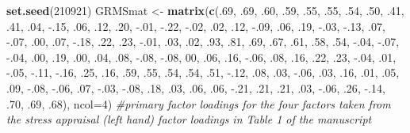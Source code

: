 \documentclass[
  english,
]{book}
\newenvironment{Shaded}{\begin{snugshade}}{\end{snugshade}}
\newcommand{\CommentTok}[1]{\textcolor[rgb]{0.56,0.35,0.01}{\textit{#1}}}
\newcommand{\DataTypeTok}[1]{\textcolor[rgb]{0.13,0.29,0.53}{#1}}
\newcommand{\DecValTok}[1]{\textcolor[rgb]{0.00,0.00,0.81}{#1}}
\newcommand{\FloatTok}[1]{\textcolor[rgb]{0.00,0.00,0.81}{#1}}
\newcommand{\KeywordTok}[1]{\textcolor[rgb]{0.13,0.29,0.53}{\textbf{#1}}}
\newcommand{\NormalTok}[1]{#1}
\newcommand{\StringTok}[1]{\textcolor[rgb]{0.31,0.60,0.02}{#1}}
\begin{document}
\begin{Shaded}
\begin{Highlighting}[]
\KeywordTok{set.seed}\NormalTok{(}\DecValTok{210921}\NormalTok{)}
\NormalTok{GRMSmat <-}\StringTok{ }\KeywordTok{matrix}\NormalTok{(}\KeywordTok{c}\NormalTok{(.}\DecValTok{69}\NormalTok{, }\FloatTok{.69}\NormalTok{, }\FloatTok{.60}\NormalTok{, }\FloatTok{.59}\NormalTok{, }\FloatTok{.55}\NormalTok{, }\FloatTok{.55}\NormalTok{, }\FloatTok{.54}\NormalTok{, }\FloatTok{.50}\NormalTok{, }\FloatTok{.41}\NormalTok{, }\FloatTok{.41}\NormalTok{, }\FloatTok{.04}\NormalTok{, }\FloatTok{-.15}\NormalTok{, }\FloatTok{.06}\NormalTok{, }\FloatTok{.12}\NormalTok{, }\FloatTok{.20}\NormalTok{, }\FloatTok{-.01}\NormalTok{, }\FloatTok{-.22}\NormalTok{, }\FloatTok{-.02}\NormalTok{, }\FloatTok{.02}\NormalTok{, }\FloatTok{.12}\NormalTok{, }\FloatTok{-.09}\NormalTok{, }\FloatTok{.06}\NormalTok{, }\FloatTok{.19}\NormalTok{, }\FloatTok{-.03}\NormalTok{, }\FloatTok{-.13}\NormalTok{,}
                  \FloatTok{.07}\NormalTok{, }\FloatTok{-.07}\NormalTok{, }\FloatTok{.00}\NormalTok{, }\FloatTok{.07}\NormalTok{, }\FloatTok{-.18}\NormalTok{, }\FloatTok{.22}\NormalTok{, }\FloatTok{.23}\NormalTok{, }\FloatTok{-.01}\NormalTok{, }\FloatTok{.03}\NormalTok{, }\FloatTok{.02}\NormalTok{, }\FloatTok{.93}\NormalTok{, }\FloatTok{.81}\NormalTok{, }\FloatTok{.69}\NormalTok{, }\FloatTok{.67}\NormalTok{, }\FloatTok{.61}\NormalTok{, }\FloatTok{.58}\NormalTok{, }\FloatTok{.54}\NormalTok{, }\FloatTok{-.04}\NormalTok{, }\FloatTok{-.07}\NormalTok{, }\FloatTok{-.04}\NormalTok{, }\FloatTok{.00}\NormalTok{, }\FloatTok{.19}\NormalTok{, }\FloatTok{.00}\NormalTok{, }\FloatTok{.04}\NormalTok{, }\FloatTok{.08}\NormalTok{,}
                  \FloatTok{-.08}\NormalTok{, }\FloatTok{-.08}\NormalTok{, }\DecValTok{00}\NormalTok{, }\FloatTok{.06}\NormalTok{, }\FloatTok{.16}\NormalTok{, }\FloatTok{-.06}\NormalTok{, }\FloatTok{.08}\NormalTok{, }\FloatTok{.16}\NormalTok{, }\FloatTok{.22}\NormalTok{, }\FloatTok{.23}\NormalTok{, }\FloatTok{-.04}\NormalTok{, }\FloatTok{.01}\NormalTok{, }\FloatTok{-.05}\NormalTok{, }\FloatTok{-.11}\NormalTok{, }\FloatTok{-.16}\NormalTok{, }\FloatTok{.25}\NormalTok{, }\FloatTok{.16}\NormalTok{, }\FloatTok{.59}\NormalTok{, }\FloatTok{.55}\NormalTok{, }\FloatTok{.54}\NormalTok{, }\FloatTok{.54}\NormalTok{, }\FloatTok{.51}\NormalTok{, }\FloatTok{-.12}\NormalTok{, }\FloatTok{.08}\NormalTok{, }\FloatTok{.03}\NormalTok{,}
                  \FloatTok{-.06}\NormalTok{, }\FloatTok{.03}\NormalTok{, }\FloatTok{.16}\NormalTok{, }\FloatTok{.01}\NormalTok{, }\FloatTok{.05}\NormalTok{, }\FloatTok{.09}\NormalTok{, }\FloatTok{-.08}\NormalTok{, }\FloatTok{-.06}\NormalTok{, }\FloatTok{.07}\NormalTok{, }\FloatTok{-.03}\NormalTok{, }\FloatTok{-.08}\NormalTok{, }\FloatTok{.18}\NormalTok{, }\FloatTok{.03}\NormalTok{, }\FloatTok{.06}\NormalTok{, }\FloatTok{.06}\NormalTok{, }\FloatTok{-.21}\NormalTok{, }\FloatTok{.21}\NormalTok{, }\FloatTok{.21}\NormalTok{, }\FloatTok{.03}\NormalTok{, }\FloatTok{-.06}\NormalTok{, }\FloatTok{.26}\NormalTok{, }\FloatTok{-.14}\NormalTok{, }\FloatTok{.70}\NormalTok{, }\FloatTok{.69}\NormalTok{, }\FloatTok{.68}\NormalTok{), }\DataTypeTok{ncol=}\DecValTok{4}\NormalTok{) }\CommentTok{#primary factor loadings for the four factors taken from the stress appraisal (left hand) factor loadings in Table 1 of the manuscript}

\end{Highlighting}
\end{Shaded}
\end{document}
